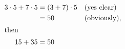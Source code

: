\documentclass{article}
\begin{document}
\vspace*{\fill} \vspace*{-5ex}
\begin{align*}
3\cdot 5+7\cdot 5&=(3+7)
\cdot5 &&\text{(yes clear)}\\
&=50&&\text{(obviously),}\\
\intertext{then}
15+35 &=50
\end{align*}
\vspace*{\fill}
\end{document}
